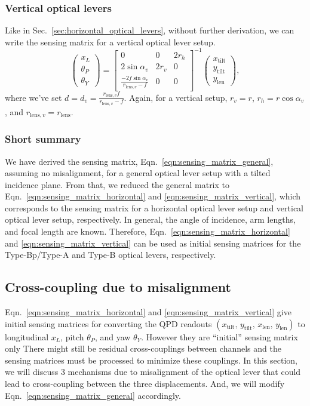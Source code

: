 \subsubsection{Vertical optical levers}
Like in Sec.~\ref{sec:horizontal_optical_levers}, without further derivation, we can write the sensing matrix for a vertical optical lever setup.
\begin{equation}
	\begin{pmatrix}
		x_L\\
		\theta_P\\
		\theta_Y
	\end{pmatrix}
	=
	\begin{bmatrix}
		0 & 0 & 2r_h\\
		2\sin\alpha_v & 2r_v & 0\\
		\frac{-2f\sin\alpha_v}{r_{\mathrm{lens},v}-f} & 0 & 0
	\end{bmatrix}^{-1}
	\begin{pmatrix}
		x_\mathrm{tilt}\\
		y_\mathrm{tilt}\\
		y_\mathrm{len}
	\end{pmatrix},
	\label{eqn:sensing_matrix_vertical}
\end{equation}
where we've set $d=d_v=\frac{r_{\mathrm{lens},v}f}{r_{\mathrm{lens},v}-f}$.
Again, for a vertical setup, $r_v=r$, $r_h=r\cos\alpha_v$, and $r_{\mathrm{lens},v}=r_\mathrm{lens}$.

\subsubsection{Short summary}
We have derived the sensing matrix, Eqn.~\eqref{eqn:sensing_matrix_general}, assuming no misalignment, for a general optical lever setup with a tilted incidence plane.
From that, we reduced the general matrix to Eqn.~\eqref{eqn:sensing_matrix_horizontal} and \eqref{eqn:sensing_matrix_vertical}, which corresponds to the sensing matrix for a horizontal optical lever setup and vertical optical lever setup, respectively.
In general, the angle of incidence, arm lengths, and focal length are known.
Therefore, Eqn.~\eqref{eqn:sensing_matrix_horizontal} and \eqref{eqn:sensing_matrix_vertical} can be used as initial sensing matrices for the Type-Bp/Type-A and Type-B optical levers, respectively.


\subsection{Cross-coupling due to misalignment}
Eqn.~\eqref{eqn:sensing_matrix_horizontal} and \eqref{eqn:sensing_matrix_vertical} give initial sensing matrices for converting the QPD readouts $\left(x_\mathrm{tilt},\,y_\mathrm{tilt},\,x_\mathrm{len},\,y_\mathrm{len}\right)$ to longitudinal $x_L$, pitch $\theta_P$, and yaw $\theta_Y$.
However they are ``initial'' sensing matrix only
There might still be residual cross-couplings between channels and the sensing matrices must be processed to minimize these couplings.
In this section, we will discuss 3 mechanisms due to misalignment of the optical lever that could lead to cross-coupling between the three displacements.
And, we will modify Eqn.~\eqref{eqn:sensing_matrix_general} accordingly.

